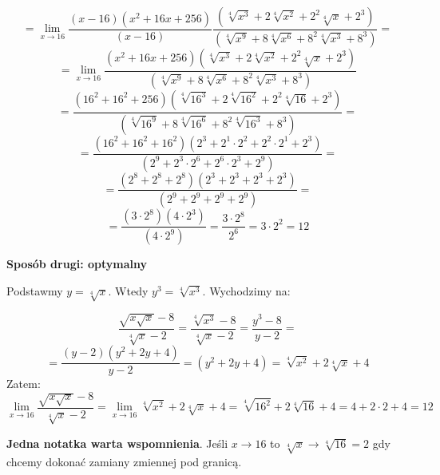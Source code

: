 \documentclass{article}
\begin{document}
\begin{equation*}
    = \lim_{x \to 16} \frac{(x-16)(x^2 + 16x + 256)}{(x - 16)}\frac{(\sqrt[4]{x^3} + 2\sqrt[4]{x^2} + 2^{2}\sqrt[4]{x} + 2^3)}{(\sqrt[4]{x^9} + 8\sqrt[4]{x^6} + 8^{2}\sqrt[4]{x^3} + 8^3)} =
\end{equation*}
\begin{equation*}
    = \lim_{x \to 16} \frac{(x^2 + 16x + 256)(\sqrt[4]{x^3} + 2\sqrt[4]{x^2} + 2^{2}\sqrt[4]{x} + 2^3)}{(\sqrt[4]{x^9} + 8\sqrt[4]{x^6} + 8^{2}\sqrt[4]{x^3} + 8^3)}
\end{equation*}
\begin{equation*}
    = \frac{(16^2 + 16^2 + 256)(\sqrt[4]{16^3} + 2\sqrt[4]{16^2} + 2^{2}\sqrt[4]{16} + 2^3)}{(\sqrt[4]{16^9} + 8\sqrt[4]{16^6} + 8^{2}\sqrt[4]{16^3} + 8^3)} =
\end{equation*}
\begin{equation*}
    = \frac{(16^2 + 16^2 + 16^2)(2^3 + 2^{1} \cdot 2^{2} + 2^{2} \cdot 2^{1} + 2^3)}{(2^9 + 2^{3} \cdot 2^{6} + 2^{6} \cdot 2^{3} + 2^{9})} = 
\end{equation*}
\begin{equation*}
    = \frac{(2^8 + 2^8 + 2^8)(2^3 + 2^3 + 2^3 + 2^3)}{(2^9 + 2^9 + 2^9 + 2^9)} = 
\end{equation*}
\begin{equation*}
    =  \frac{(3 \cdot 2^8)(4 \cdot 2^3)}{(4 \cdot 2^9)} = \frac{3 \cdot 2^8}{2^6} = 3 \cdot 2^2 = 12
\end{equation*}

\textbf{Sposób drugi: optymalny}

Podstawmy \(y = \sqrt[4]{x}\). Wtedy \(y^3 = \sqrt[4]{x^3}\). Wychodzimy na:

\begin{equation*}
    \frac{\sqrt{x \sqrt{x}} - 8}{\sqrt[4]{x} - 2} = \frac{\sqrt[4]{x^3} - 8}{\sqrt[4]{x} - 2} = \frac{y^3 - 8}{y - 2} = 
\end{equation*}
\begin{equation*}
    = \frac{(y - 2)(y^2 + 2y + 4)}{y -2} = (y^2 + 2y + 4) = \sqrt[4]{x^2} + 2\sqrt[4]{x} + 4 
\end{equation*}
%
Zatem:
%
\begin{equation*}
    \lim_{x \to 16} \frac{\sqrt{x \sqrt{x}} - 8}{\sqrt[4]{x} - 2} = \lim_{x \to 16} \sqrt[4]{x^2} + 2\sqrt[4]{x} + 4 = \sqrt[4]{16^2} + 2\sqrt[4]{16} + 4 = 4 + 2 \cdot 2 + 4 = 12
\end{equation*}

\textbf{Jedna notatka warta wspomnienia}. Jeśli \(x\to 16\) to \(\sqrt[4]{x} \to \sqrt[4]{16}=2\) gdy chcemy
dokonać zamiany zmiennej pod granicą.
\end{document}
